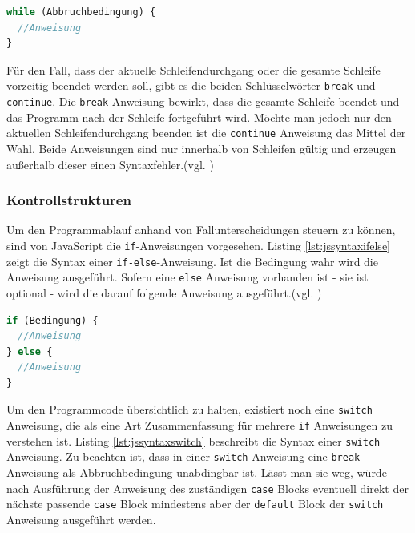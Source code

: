 \vspace{1em}
\begin{lstlisting}[language=JavaScript, caption=Syntax While-Schleife, label=lst:jssyntaxwhile]
while (Abbruchbedingung) {
  //Anweisung
}
\end{lstlisting}
	
Für den Fall, dass der aktuelle Schleifendurchgang oder die gesamte Schleife vorzeitig beendet werden soll, gibt es die beiden Schlüsselwörter \texttt{break} und \texttt{continue}. Die \texttt{break} Anweisung bewirkt, dass die gesamte Schleife beendet und das Programm nach der Schleife fortgeführt wird. Möchte man jedoch nur den aktuellen Schleifendurchgang beenden ist die \texttt{continue} Anweisung das Mittel der Wahl. Beide Anweisungen sind nur innerhalb von Schleifen gültig und erzeugen außerhalb dieser einen Syntaxfehler.(vgl. \cite[S.103f]{FlanJava2007})

\subsubsection{Kontrollstrukturen} Um den Programmablauf anhand von Fallunterscheidungen steuern zu können, sind von JavaScript die \texttt{if}-Anweisungen vorgesehen. Listing \ref{lst:jssyntaxifelse} zeigt die Syntax einer \texttt{if-else}-Anweisung. Ist die Bedingung wahr wird die Anweisung ausgeführt. Sofern eine \texttt{else} Anweisung vorhanden ist - sie ist optional - wird die darauf folgende Anweisung ausgeführt.(vgl. \cite[S.80]{WenzJava2008})

\vspace{1em}
\begin{lstlisting}[language=JavaScript, caption=Syntax If-else-Anweisung, label=lst:jssyntaxifelse]
if (Bedingung) {
  //Anweisung
} else {
  //Anweisung
}
\end{lstlisting}
	
Um den Programmcode übersichtlich zu halten, existiert noch eine \texttt{switch} Anweisung, die als eine Art Zusammenfassung für mehrere \texttt{if} Anweisungen zu verstehen ist. Listing \ref{lst:jssyntaxswitch} beschreibt die Syntax einer \texttt{switch} Anweisung. Zu beachten ist, dass in einer \texttt{switch} Anweisung eine \texttt{break} Anweisung als Abbruchbedingung unabdingbar ist. Lässt man sie weg, würde nach Ausführung der Anweisung des zuständigen \texttt{case} Blocks eventuell direkt der nächste passende \texttt{case} Block mindestens aber der \texttt{default} Block der \texttt{switch} Anweisung ausgeführt werden.

